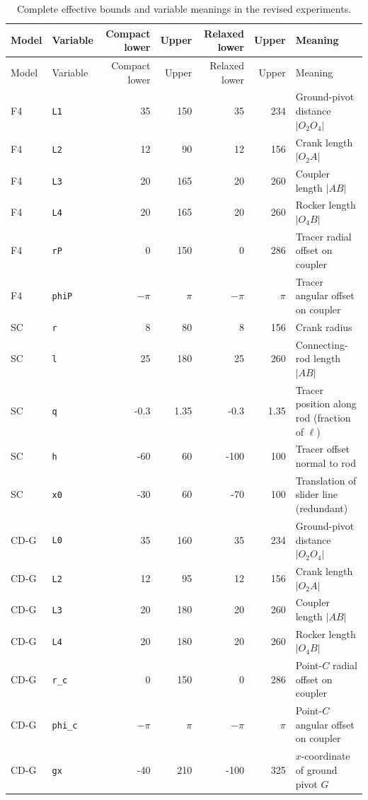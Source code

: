 \small
\setlength{\tabcolsep}{3.5pt}
\begin{longtable}{@{}llrrrrp{4.3cm}@{}}
\caption{Complete effective bounds and variable meanings in the revised experiments.}\label{tab:v2_bounds}\\
\toprule Model & Variable & Compact lower & Upper & Relaxed lower & Upper & Meaning \\ \midrule\endfirsthead
\toprule Model & Variable & Compact lower & Upper & Relaxed lower & Upper & Meaning \\ \midrule\endhead
F4 & \texttt{L1} & 35 & 150 & 35 & 234 & Ground-pivot distance $|O_2O_4|$ \\
F4 & \texttt{L2} & 12 & 90 & 12 & 156 & Crank length $|O_2A|$ \\
F4 & \texttt{L3} & 20 & 165 & 20 & 260 & Coupler length $|AB|$ \\
F4 & \texttt{L4} & 20 & 165 & 20 & 260 & Rocker length $|O_4B|$ \\
F4 & \texttt{rP} & 0 & 150 & 0 & 286 & Tracer radial offset on coupler \\
F4 & \texttt{phiP} & $-\pi$ & $\pi$ & $-\pi$ & $\pi$ & Tracer angular offset on coupler \\
\addlinespace
SC & \texttt{r} & 8 & 80 & 8 & 156 & Crank radius \\
SC & \texttt{l} & 25 & 180 & 25 & 260 & Connecting-rod length $|AB|$ \\
SC & \texttt{q} & -0.3 & 1.35 & -0.3 & 1.35 & Tracer position along rod (fraction of $\ell$) \\
SC & \texttt{h} & -60 & 60 & -100 & 100 & Tracer offset normal to rod \\
SC & \texttt{x0} & -30 & 60 & -70 & 100 & Translation of slider line (redundant) \\
\addlinespace
CD-G & \texttt{L0} & 35 & 160 & 35 & 234 & Ground-pivot distance $|O_2O_4|$ \\
CD-G & \texttt{L2} & 12 & 95 & 12 & 156 & Crank length $|O_2A|$ \\
CD-G & \texttt{L3} & 20 & 180 & 20 & 260 & Coupler length $|AB|$ \\
CD-G & \texttt{L4} & 20 & 180 & 20 & 260 & Rocker length $|O_4B|$ \\
CD-G & \texttt{r\_c} & 0 & 150 & 0 & 286 & Point-$C$ radial offset on coupler \\
CD-G & \texttt{phi\_c} & $-\pi$ & $\pi$ & $-\pi$ & $\pi$ & Point-$C$ angular offset on coupler \\
CD-G & \texttt{gx} & -40 & 210 & -100 & 325 & $x$-coordinate of ground pivot $G$ \\

\end{longtable}
